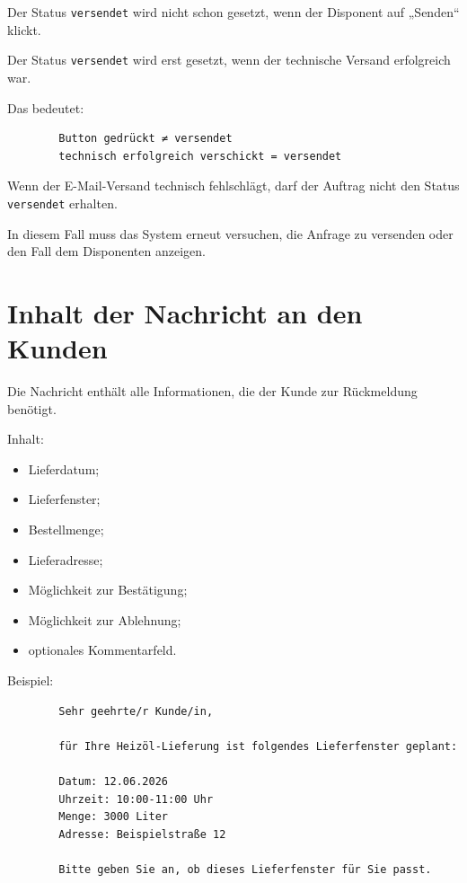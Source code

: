 \documentclass[12pt,a4paper]{article}
\begin{document}
	Der Status \texttt{versendet} wird nicht schon gesetzt, wenn der Disponent auf „Senden“ klickt.
	
	Der Status \texttt{versendet} wird erst gesetzt, wenn der technische Versand erfolgreich war.
	
	Das bedeutet:
	
	\begin{lstlisting}
		Button gedrückt ≠ versendet
		technisch erfolgreich verschickt = versendet
	\end{lstlisting}
	
	Wenn der E-Mail-Versand technisch fehlschlägt, darf der Auftrag nicht den Status \texttt{versendet} erhalten.
	
	In diesem Fall muss das System erneut versuchen, die Anfrage zu versenden oder den Fall dem Disponenten anzeigen.
	
	\section{Inhalt der Nachricht an den Kunden}
	
	Die Nachricht enthält alle Informationen, die der Kunde zur Rückmeldung benötigt.
	
	Inhalt:
	
	\begin{itemize}
		\item Lieferdatum;
		\item Lieferfenster;
		\item Bestellmenge;
		\item Lieferadresse;
		\item Möglichkeit zur Bestätigung;
		\item Möglichkeit zur Ablehnung;
		\item optionales Kommentarfeld.
	\end{itemize}
	
	Beispiel:
	
	\begin{lstlisting}
		Sehr geehrte/r Kunde/in,
		
		für Ihre Heizöl-Lieferung ist folgendes Lieferfenster geplant:
		
		Datum: 12.06.2026
		Uhrzeit: 10:00-11:00 Uhr
		Menge: 3000 Liter
		Adresse: Beispielstraße 12
		
		Bitte geben Sie an, ob dieses Lieferfenster für Sie passt.
	\end{lstlisting}
	
\end{document}
